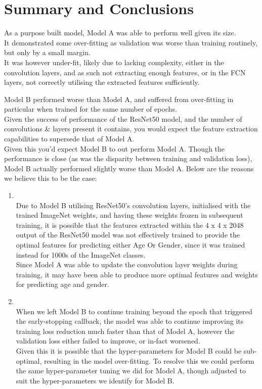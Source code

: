 \section{Summary and Conclusions}

As a purpose built model, Model A was able to perform well given its size. \\
It demonstrated some over-fitting as validation was worse than training routinely, but only by a small margin.\\
It was however under-fit, likely due to lacking complexity, either in the convolution layers, and as such not extracting enough features, or in the FCN layers, not correctly utilising the extracted features sufficiently.

Model B performed worse than Model A, and suffered from over-fitting in particular when trained for the same number of epochs.\\
Given the success of performance of the ResNet50 model, and the number of convolutions \& layers present it contains, you would expect the feature extraction capabilities to supersede that of Model A.\\
Given this you'd expect Model B to out perform Model A.
Though the performance is close (as was the disparity between training and validation loss), Model B actually performed slightly worse than Model A.
Below are the reasons we believe this to be the case:
\begin{enumerate}
    \item {}\\
    Due to Model B utilising ResNet50's convolution layers, initialised with the trained ImageNet weights, and having these weights frozen in subsequent training, it is possible that the features extracted within the 4 x 4 x 2048 output of the ResNet50 model was not effectively trained to provide the optimal features for predicting either Age Or Gender, since it was trained instead for 1000s of the ImageNet classes.\\
    Since Model A was able to update the convolution layer weights during training, it may have been able to produce more optimal features and weights for predicting age and gender.

    \item {}\\
    When we left Model B to continue training beyond the epoch that triggered the early-stopping callback, the model was able to continue improving its training loss reduction much faster than that of Model A, however the validation loss either failed to improve, or in-fact worsened.\\
    Given this it is possible that the hyper-parameters for Model B could be sub-optimal, resulting in the model over-fitting.
    To resolve this we could perform the same hyper-parameter tuning we did for Model A, though adjusted to suit the hyper-parameters we identify for Model B.
\end{enumerate}